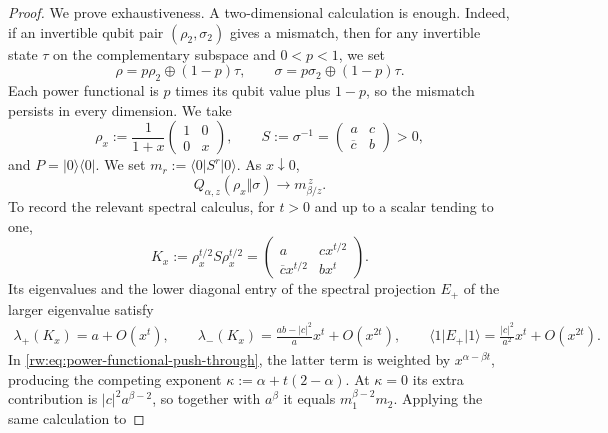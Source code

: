 \documentclass[10pt,a4paper]{amsart}
\begin{document}
\begin{proof}
We prove exhaustiveness.  A two-dimensional calculation is enough.
Indeed, if an invertible qubit pair $(\rho_2,\sigma_2)$ gives a mismatch,
then for any invertible state $\tau$ on the complementary subspace and
$0<p<1$, we set
\begin{equation}
 \rho=p\rho_2\oplus(1-p)\tau,
 \qquad
 \sigma=p\sigma_2\oplus(1-p)\tau.
 \label{rw:eq:real-t-qubit-embedding}
\end{equation}
Each power functional is $p$ times its qubit value plus $1-p$, so
the mismatch persists in every dimension.  We take
\begin{equation}
 \rho_x:=\frac{1}{1+x}
 \begin{pmatrix}1&0\\0&x\end{pmatrix},
 \qquad
 S:=\sigma^{-1}
 =\begin{pmatrix}a&c\\ \overline c&b\end{pmatrix}>0,
 \label{rw:eq:real-t-rank-one-witness}
\end{equation}
and $P=\lvert0\rangle\!\langle0\rvert$.  We set
$m_r:=\langle0\rvert S^r\lvert0\rangle$.  As $x\downarrow0$,
\begin{equation}
 Q_{\alpha,z}(\rho_x\Vert\sigma)
 \longrightarrow m_{\beta/z}^{\,z}.
 \label{rw:eq:real-t-alpha-z-pure-limit}
\end{equation}
To record the relevant spectral calculus, for $t>0$ and up to a
scalar tending to one,
\begin{equation}
 K_x:=\rho_x^{t/2}S\rho_x^{t/2}
 =\begin{pmatrix}
   a&cx^{t/2}\\ \overline c x^{t/2}&bx^t
  \end{pmatrix}.
 \label{rw:eq:real-t-spectral-block}
\end{equation}
Its eigenvalues and the lower diagonal entry of the spectral
projection $E_+$ of the larger eigenvalue satisfy
\begin{align}
 \lambda_+(K_x)=a+O(x^t), \qquad
 \lambda_-(K_x)=\frac{ab-\lvert c\rvert^2}{a}x^t+O(x^{2t}), \qquad
 \langle1\rvert E_+\lvert1\rangle
 =\frac{\lvert c\rvert^2}{a^2}x^t+O(x^{2t}).
 \label{rw:eq:real-t-spectral-asymptotics}
\end{align}
In \eqref{rw:eq:power-functional-push-through}, the latter term is
weighted by $x^{\alpha-\beta t}$, producing the competing exponent
$\kappa:=\alpha+t(2-\alpha)$.  At $\kappa=0$ its extra contribution
is $\lvert c\rvert^2a^{\beta-2}$, so together with $a^\beta$ it
equals $m_1^{\beta-2}m_2$.  Applying the same calculation to

\end{proof}
\end{document}
